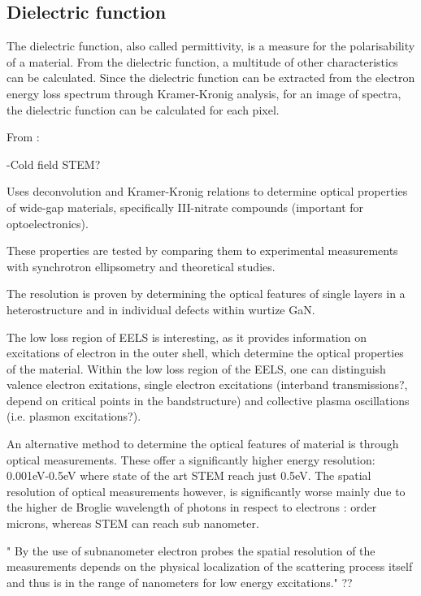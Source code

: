 \subsection{Dielectric function}

The dielectric function, also called permittivity, is a measure for the polarisability of a material. From the dielectric function, a multitude of other characteristics can be calculated. Since the dielectric function can be extracted from the electron energy loss spectrum through Kramer-Kronig analysis, for an image of spectra, the dielectric function can be calculated for each pixel. \cite{egerton_book}



From \cite{brockt_lakner_2000}:

-Cold field STEM?


Uses deconvolution and Kramer-Kronig relations to determine optical properties of wide-gap materials, specifically III-nitrate compounds (important for optoelectronics).

These properties are tested by comparing them to experimental measurements with synchrotron ellipsometry and theoretical studies.

The resolution is proven by determining the optical features of single layers in a heterostructure and in individual defects within wurtize GaN.


The low loss region of EELS is interesting, as it provides information on excitations of electron in the outer shell, which determine the optical properties of the material. Within the low loss region of the EELS, one can distinguish valence electron exitations, single electron excitations (interband transmissions?, depend on critical points in the bandstructure) and collective plasma oscillations (i.e. plasmon excitations?). 

An alternative method to determine the optical features of material is through optical measurements. These offer a significantly higher energy resolution: 0.001eV-0.5eV where state of the art STEM reach just 0.5eV. The spatial resolution of optical measurements however, is significantly worse mainly due to the higher de Broglie wavelength of photons in respect to electrons \cite{iets}: order microns, whereas STEM can reach sub nanometer.


"
By the use of subnanometer electron probes the spatial resolution of the measurements depends on the physical localization of the scattering process itself and thus is in the range of nanometers for low energy excitations." ?? 


